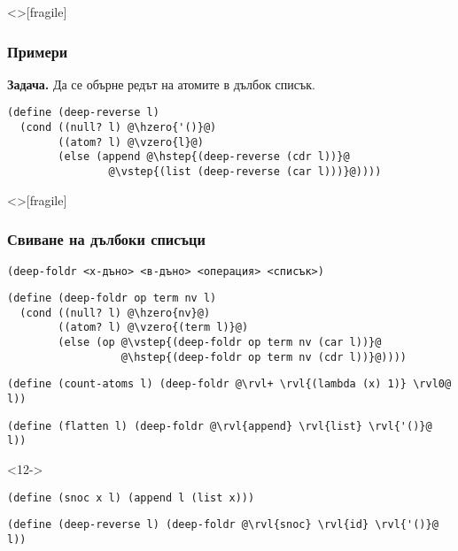\documentclass[alsotrans,beameroptions={aspectratio=169}]{beamerswitch}
\newcommand{\hzero}{\textcolor{red}}
\newcommand{\vzero}{\textcolor{orange}}
\newcommand{\hstep}{\textcolor{green}}
\newcommand{\vstep}{\textcolor{cyan}}
\begin{document}
\begin{frame}<>[fragile]
  \frametitle{Примери}

  \textbf{Задача.} Да се обърне редът на атомите в дълбок списък.\\
  \pause
\begin{lstlisting}
(define (deep-reverse l)
  (cond ((null? l) @\hzero{'()}@)
        ((atom? l) @\vzero{l}@)
        (else (append @\hstep{(deep-reverse (cdr l))}@
                @\vstep{(list (deep-reverse (car l)))}@))))
\end{lstlisting}
\end{frame}

\begin{frame}<>[fragile]
  \frametitle{Свиване на дълбоки списъци}

  \tt{(deep-foldr }<х-дъно> <в-дъно> <операция> <списък>\tt)\\
  \pause
  \onslide<+->
\begin{lstlisting}
(define (deep-foldr op term nv l)
  (cond ((null? l) @\hzero{nv}@)
        ((atom? l) @\vzero{(term l)}@)
        (else (op @\vstep{(deep-foldr op term nv (car l))}@
                  @\hstep{(deep-foldr op term nv (cdr l))}@))))
\end{lstlisting}
  \onslide<+->
\begin{lstlisting}
(define (count-atoms l) (deep-foldr @\rvl+ \rvl{(lambda (x) 1)} \rvl0@ l))
\end{lstlisting}
  \onslide<+->
\begin{lstlisting}
(define (flatten l) (deep-foldr @\rvl{append} \rvl{list} \rvl{'()}@ l))
\end{lstlisting}
  \onslide<+->
  \begin{visibleenv}<12->
\begin{lstlisting}
(define (snoc x l) (append l (list x)))\end{lstlisting}%
  \end{visibleenv}%
\begin{lstlisting}
(define (deep-reverse l) (deep-foldr @\rvl{snoc} \rvl{id} \rvl{'()}@ l))
\end{lstlisting}
\end{frame}
\end{document}

